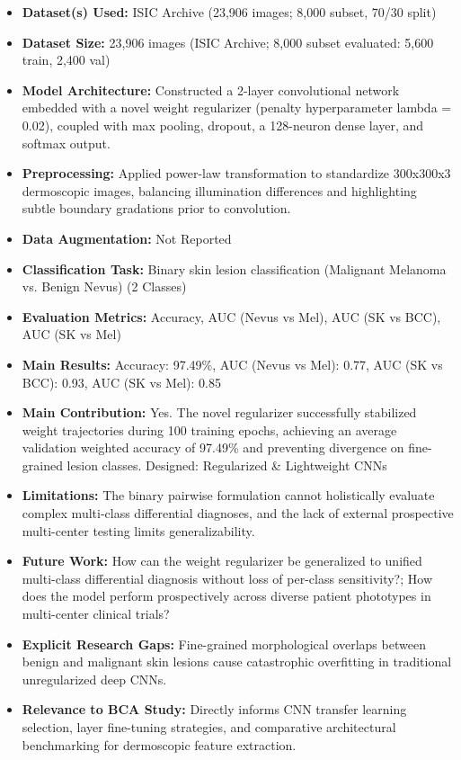 \documentclass[11pt,a4paper]{article}
\begin{document}
\begin{itemize}\small
\item \textbf{Dataset(s) Used:} ISIC Archive (23,906 images; 8,000 subset, 70/30 split)
\item \textbf{Dataset Size:} 23,906 images (ISIC Archive; 8,000 subset evaluated: 5,600 train, 2,400 val)
\item \textbf{Model Architecture:} Constructed a 2-layer convolutional network embedded with a novel weight regularizer (penalty hyperparameter lambda = 0.02), coupled with max pooling, dropout, a 128-neuron dense layer, and softmax output.
\item \textbf{Preprocessing:} Applied power-law transformation to standardize 300x300x3 dermoscopic images, balancing illumination differences and highlighting subtle boundary gradations prior to convolution.
\item \textbf{Data Augmentation:} Not Reported
\item \textbf{Classification Task:} Binary skin lesion classification (Malignant Melanoma vs. Benign Nevus) (2 Classes)
\item \textbf{Evaluation Metrics:} Accuracy, AUC (Nevus vs Mel), AUC (SK vs BCC), AUC (SK vs Mel)
\item \textbf{Main Results:} Accuracy: 97.49\%, AUC (Nevus vs Mel): 0.77, AUC (SK vs BCC): 0.93, AUC (SK vs Mel): 0.85
\item \textbf{Main Contribution:} Yes. The novel regularizer successfully stabilized weight trajectories during 100 training epochs, achieving an average validation weighted accuracy of 97.49\% and preventing divergence on fine-grained lesion classes. Designed: Regularized \& Lightweight CNNs
\item \textbf{Limitations:} The binary pairwise formulation cannot holistically evaluate complex multi-class differential diagnoses, and the lack of external prospective multi-center testing limits generalizability.
\item \textbf{Future Work:} How can the weight regularizer be generalized to unified multi-class differential diagnosis without loss of per-class sensitivity?; How does the model perform prospectively across diverse patient phototypes in multi-center clinical trials?
\item \textbf{Explicit Research Gaps:} Fine-grained morphological overlaps between benign and malignant skin lesions cause catastrophic overfitting in traditional unregularized deep CNNs.
\item \textbf{Relevance to BCA Study:} Directly informs CNN transfer learning selection, layer fine-tuning strategies, and comparative architectural benchmarking for dermoscopic feature extraction.
\end{itemize}
\end{document}
